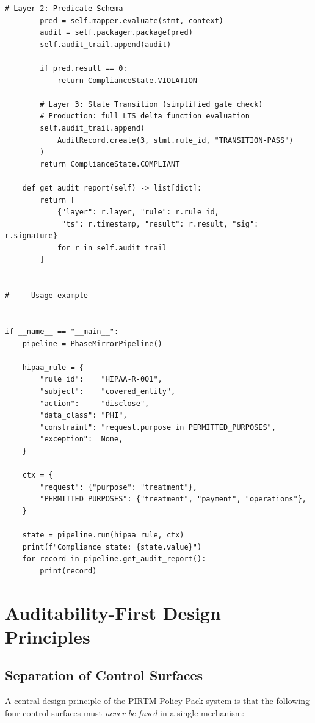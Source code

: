 \documentclass[12pt,letterpaper]{article}
\theoremstyle{definition}
\theoremstyle{plain}
\theoremstyle{remark}
\begin{document}
\begin{lstlisting}[style=pythonStyle,
  caption={PIRTM Policy Pack agent pipeline skeleton (Python 3.12+)}]
        # Layer 2: Predicate Schema
        pred = self.mapper.evaluate(stmt, context)
        audit = self.packager.package(pred)
        self.audit_trail.append(audit)

        if pred.result == 0:
            return ComplianceState.VIOLATION

        # Layer 3: State Transition (simplified gate check)
        # Production: full LTS delta function evaluation
        self.audit_trail.append(
            AuditRecord.create(3, stmt.rule_id, "TRANSITION-PASS")
        )
        return ComplianceState.COMPLIANT

    def get_audit_report(self) -> list[dict]:
        return [
            {"layer": r.layer, "rule": r.rule_id,
             "ts": r.timestamp, "result": r.result, "sig": r.signature}
            for r in self.audit_trail
        ]


# --- Usage example ------------------------------------------------------------

if __name__ == "__main__":
    pipeline = PhaseMirrorPipeline()

    hipaa_rule = {
        "rule_id":    "HIPAA-R-001",
        "subject":    "covered_entity",
        "action":     "disclose",
        "data_class": "PHI",
        "constraint": "request.purpose in PERMITTED_PURPOSES",
        "exception":  None,
    }

    ctx = {
        "request": {"purpose": "treatment"},
        "PERMITTED_PURPOSES": {"treatment", "payment", "operations"},
    }

    state = pipeline.run(hipaa_rule, ctx)
    print(f"Compliance state: {state.value}")
    for record in pipeline.get_audit_report():
        print(record)
\end{lstlisting}

\section{Auditability-First Design Principles}
\label{sec:audit}

\subsection{Separation of Control Surfaces}

A central design principle of the PIRTM Policy Pack system is that the following
four control surfaces must \emph{never be fused} in a single mechanism:
\end{document}
